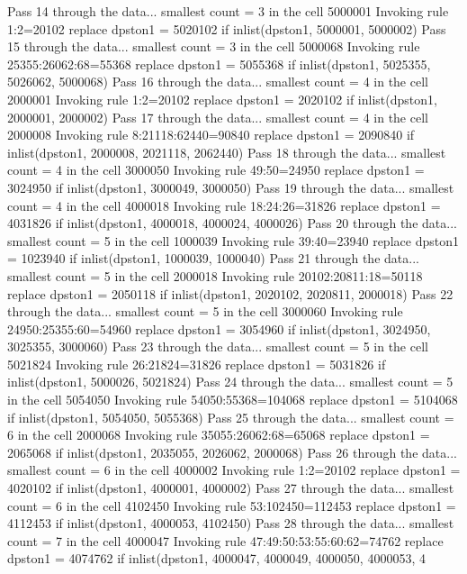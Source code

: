 Pass 14 through the data...
  smallest count = 3 in the cell      5000001
  Invoking rule 1:2=20102
  replace dpston1 = 5020102 if inlist(dpston1, 5000001, 5000002)
Pass 15 through the data...
  smallest count = 3 in the cell      5000068
  Invoking rule 25355:26062:68=55368
  replace dpston1 = 5055368 if inlist(dpston1, 5025355, 5026062, 5000068)
Pass 16 through the data...
  smallest count = 4 in the cell      2000001
  Invoking rule 1:2=20102
  replace dpston1 = 2020102 if inlist(dpston1, 2000001, 2000002)
Pass 17 through the data...
  smallest count = 4 in the cell      2000008
  Invoking rule 8:21118:62440=90840
  replace dpston1 = 2090840 if inlist(dpston1, 2000008, 2021118, 2062440)
Pass 18 through the data...
  smallest count = 4 in the cell      3000050
  Invoking rule 49:50=24950
  replace dpston1 = 3024950 if inlist(dpston1, 3000049, 3000050)
Pass 19 through the data...
  smallest count = 4 in the cell      4000018
  Invoking rule 18:24:26=31826
  replace dpston1 = 4031826 if inlist(dpston1, 4000018, 4000024, 4000026)
Pass 20 through the data...
  smallest count = 5 in the cell      1000039
  Invoking rule 39:40=23940
  replace dpston1 = 1023940 if inlist(dpston1, 1000039, 1000040)
Pass 21 through the data...
  smallest count = 5 in the cell      2000018
  Invoking rule 20102:20811:18=50118
  replace dpston1 = 2050118 if inlist(dpston1, 2020102, 2020811, 2000018)
Pass 22 through the data...
  smallest count = 5 in the cell      3000060
  Invoking rule 24950:25355:60=54960
  replace dpston1 = 3054960 if inlist(dpston1, 3024950, 3025355, 3000060)
Pass 23 through the data...
  smallest count = 5 in the cell      5021824
  Invoking rule 26:21824=31826
  replace dpston1 = 5031826 if inlist(dpston1, 5000026, 5021824)
Pass 24 through the data...
  smallest count = 5 in the cell      5054050
  Invoking rule 54050:55368=104068
  replace dpston1 = 5104068 if inlist(dpston1, 5054050, 5055368)
Pass 25 through the data...
  smallest count = 6 in the cell      2000068
  Invoking rule 35055:26062:68=65068
  replace dpston1 = 2065068 if inlist(dpston1, 2035055, 2026062, 2000068)
Pass 26 through the data...
  smallest count = 6 in the cell      4000002
  Invoking rule 1:2=20102
  replace dpston1 = 4020102 if inlist(dpston1, 4000001, 4000002)
Pass 27 through the data...
  smallest count = 6 in the cell      4102450
  Invoking rule 53:102450=112453
  replace dpston1 = 4112453 if inlist(dpston1, 4000053, 4102450)
Pass 28 through the data...
  smallest count = 7 in the cell      4000047
  Invoking rule 47:49:50:53:55:60:62=74762
  replace dpston1 = 4074762 if inlist(dpston1, 4000047, 4000049, 4000050, 4000053, 4
